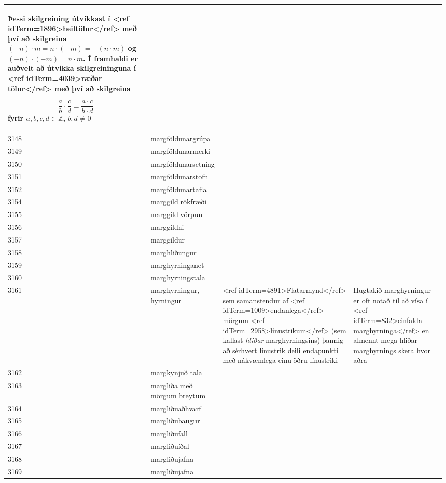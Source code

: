 \begin{longtable}{p{}|p{}|p{}|p{}|p{}}
Þessi skilgreining útvíkkast í <ref idTerm=1896>heiltölur</ref> með því að skilgreina $(-n)\cdot m = n\cdot (-m) = -(n \cdot m)$ og $(-n)\cdot (-m)=n\cdot m$. Í framhaldi er auðvelt að útvikka skilgreininguna í <ref idTerm=4039>ræðar tölur</ref> með því að skilgreina

\[ \frac{a}{b} \cdot \frac{c}{d} = \frac{a\cdot c}{b \cdot d} \] fyrir $a,b,c,d \in \mathbb{Z}$, $b,d\neq0$ &  & \\
\hline
3148 & margföldunargrúpa &  &  &  \\
\hline
3149 & margföldunarmerki &  &  &  \\
\hline
3150 & margföldunarsetning &  &  &  \\
\hline
3151 & margföldunarstofn &  &  &  \\
\hline
3152 & margföldunartafla &  &  &  \\
\hline
3154 & marggild rökfræði &  &  &  \\
\hline
3155 & marggild vörpun &  &  &  \\
\hline
3156 & marggildni &  &  &  \\
\hline
3157 & marggildur &  &  &  \\
\hline
3158 & marghliðungur &  &  &  \\
\hline
3159 & marghyrninganet &  &  &  \\
\hline
3160 & marghyrningstala &  &  &  \\
\hline
3161 & marghyrningur, hyrningur & <ref idTerm=4891>Flatarmynd</ref> sem samanstendur af <ref idTerm=1009>endanlega</ref> mörgum <ref idTerm=2958>línustrikum</ref> (sem kallast \textit{hliðar} marghyrningsins) þannig að sérhvert línustrik deili endapunkti með nákvæmlega einu öðru línustriki & Hugtakið marghyrningur er oft notað til að vísa í <ref idTerm=832>einfalda marghyrninga</ref> en almennt mega hliðar marghyrnings skera hvor aðra & \\
\hline
3162 & margkynjuð tala &  &  &  \\
\hline
3163 & margliða með mörgum breytum &  &  &  \\
\hline
3164 & margliðuaðhvarf &  &  &  \\
\hline
3165 & margliðubaugur &  &  &  \\
\hline
3166 & margliðufall &  &  &  \\
\hline
3167 & margliðuíðal &  &  &  \\
\hline
3168 & margliðujafna &  &  &  \\
\hline
3169 & margliðujafna &  &  &  \\

\end{longtable}
